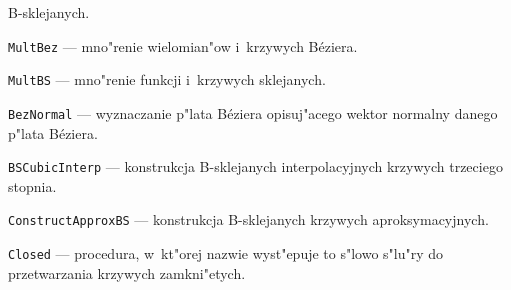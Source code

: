 \begin{mydescription}
    B-sklejanych.
  \item\texttt{MultBez} --- mno"renie wielomian"ow i~krzywych B\'{e}ziera.
  \item\texttt{MultBS} --- mno"renie funkcji i~krzywych sklejanych.
  \item\texttt{BezNormal} --- wyznaczanie p"lata B\'{e}ziera
    opisuj"acego wektor normalny danego p"lata B\'{e}ziera.
  \item\texttt{BSCubicInterp} --- konstrukcja B-sklejanych interpolacyjnych
    krzywych trzeciego stopnia.
  \item\texttt{ConstructApproxBS} --- konstrukcja B-sklejanych krzywych
    aproksymacyjnych.
  \item\texttt{Closed} --- procedura, w~kt"orej nazwie wyst"epuje to s"lowo
    s"lu"ry do przetwarzania krzywych zamkni"etych.
\end{mydescription}

